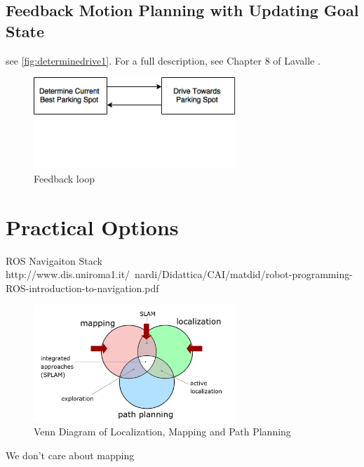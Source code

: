 \subsection{Feedback Motion Planning with Updating Goal State}
see \autoref{fig:determinedrive1}.
For a full description, see Chapter 8 of Lavalle \cite{lavalle2006planning}.

\begin{figure} %
\centering
\includegraphics[width=3in]{figures/determinedrive1.png}
\caption{Feedback loop}
\label{fig:determinedrive1}
\end{figure}   %

\section{Practical Options}
ROS Navigaiton Stack
http://www.dis.uniroma1.it/~nardi/Didattica/CAI/matdid/robot-programming-ROS-introduction-to-navigation.pdf

\begin{figure}
\centering
\includegraphics[width=3in]{figures/mappinglocalizationpathplanningvenndiagram.png}
\caption{Venn Diagram of Localization, Mapping and Path Planning}
\label{fig:mappinglocalizationpathplanningvenndiagram}
\end{figure}

We don't care about mapping
